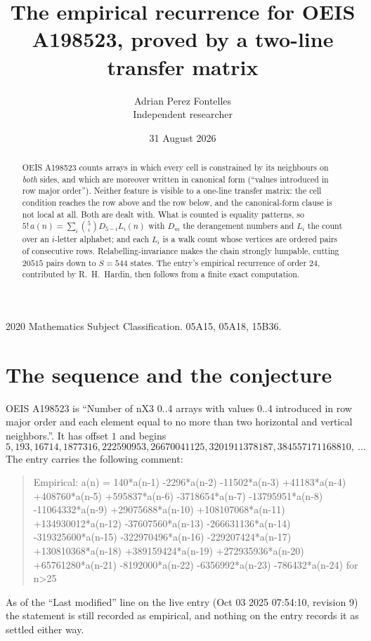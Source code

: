 \documentclass[11pt,a4paper]{article}
\title{The empirical recurrence for OEIS A198523, proved by a two-line transfer matrix}
\author{Adrian Perez Fontelles\\ \small Independent researcher}
\date{31 August 2026}
\theoremstyle{plain}
\theoremstyle{definition}
\begin{document}
\maketitle

\begin{abstract}
OEIS A198523 counts arrays in which every cell is constrained by its neighbours on \emph{both}
sides, and which are moreover written in canonical form (``values introduced in row major
order''). Neither feature is visible to a one-line transfer matrix: the cell condition
reaches the row above and the row below, and the canonical-form clause is not local at
all. Both are dealt with. What is counted is equality patterns, so
$5!\,a(n)=\sum_i\binom{5}{i}D_{5-i}L_i(n)$ with $D_m$ the derangement numbers and
$L_i$ the count over an $i$-letter alphabet; and each $L_i$ is a walk count whose vertices
are ordered pairs of consecutive rows. Relabelling-invariance makes the chain strongly
lumpable, cutting $20515$ pairs down to $S=544$ states. The entry's empirical recurrence of
order $24$, contributed by R.~H.~Hardin, then follows from a finite exact computation.
\end{abstract}

\noindent\small 2020 Mathematics Subject Classification. 05A15, 05A18, 15B36.\normalsize

\section{The sequence and the conjecture}

OEIS A198523 is ``Number of nX3 0..4 arrays with values 0..4 introduced in row major order and each element equal to no more than two horizontal and vertical neighbors.''. It has offset $1$ and begins
\[
5, 193, 16714, 1877316, 222590953, 26670041125, 3201911378187, 384557171168810,\ \dots
\]
The entry carries the following comment:
\begin{quote}\small
Empirical: a(n) = 140*a(n-1) -2296*a(n-2) -11502*a(n-3) +41183*a(n-4) +408760*a(n-5) +595837*a(n-6) -3718654*a(n-7) -13795951*a(n-8) -11064332*a(n-9) +29075688*a(n-10) +108107068*a(n-11) +134930012*a(n-12) -37607560*a(n-13) -266631136*a(n-14) -319325600*a(n-15) -322970496*a(n-16) -229207424*a(n-17) +130810368*a(n-18) +389159424*a(n-19) +272935936*a(n-20) +65761280*a(n-21) -8192000*a(n-22) -6356992*a(n-23) -786432*a(n-24) for n>25
\end{quote}
As of the ``Last modified'' line on the live entry (Oct 03 2025 07:54:10, revision 9) the statement is
still recorded as empirical, and nothing on the entry records it as settled either way.
\end{document}
